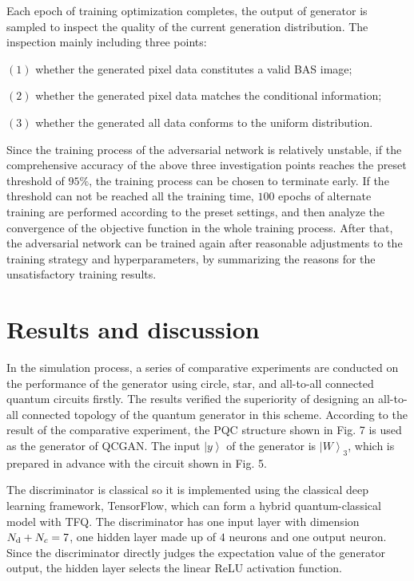 \documentclass{bmcart}
\begin{document}
Each epoch of training optimization completes, the output of generator is sampled to inspect the quality of the current generation distribution. The inspection mainly including three points:


$(1)$ whether the generated pixel data constitutes a valid BAS image;


$(2)$ whether the generated pixel data matches the conditional information;


$(3)$ whether the generated all data conforms to the uniform distribution.


Since the training process of the adversarial network is relatively unstable, if the comprehensive accuracy of the above three investigation points reaches the preset threshold of $95\% $, the training process can be chosen to terminate early. If the threshold can not be reached all the training time, $100$ epochs of alternate training are performed according to the preset settings, and then analyze the convergence of the objective function in the whole training process. After that, the adversarial network can be trained again after reasonable adjustments to the training strategy and hyperparameters, by summarizing the reasons for the unsatisfactory training results.

\section{Results and discussion}
In the simulation process, a series of comparative experiments are conducted on the performance of the generator using circle, star, and all-to-all connected quantum circuits firstly. The results verified the superiority of designing an all-to-all connected topology of the quantum generator in this scheme. According to the result of the comparative experiment, the PQC structure shown in Fig. 7 is used as the generator of QCGAN. The input $\left| y \right\rangle $ of the generator is ${\left| W \right\rangle _3}$, which is prepared in advance with the circuit shown in Fig. 5.

The discriminator is classical so it is implemented using the classical deep learning framework, TensorFlow, which can form a hybrid quantum-classical model with TFQ. The discriminator has one input layer with dimension ${N_{\rm{d}}} + {N_c} = 7$, one hidden layer made up of $4$ neurons and one output neuron. Since the discriminator directly judges the expectation value of the generator output, the hidden layer selects the linear ReLU activation function.
\end{document}
